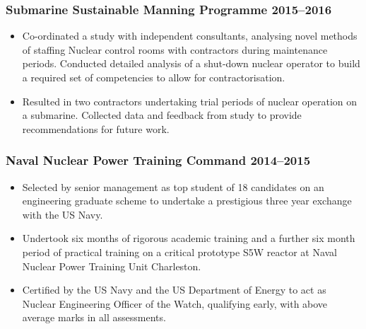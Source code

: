 \documentclass[a4paper, oneside, final, 11pt]{scrartcl} %
\begin{document}
\subsubsection*{Submarine Sustainable Manning Programme \hfill 2015--2016}  
\normalfont
\begin{itemize}
	\item Co-ordinated a study with independent consultants, analysing novel methods of staffing Nuclear control rooms with contractors during maintenance periods. Conducted detailed analysis of a shut-down nuclear operator to build a required set of competencies to allow for contractorisation.
	
	\item  Resulted in two contractors undertaking trial periods of nuclear operation on a submarine. Collected data and feedback from study to provide recommendations for future work. \end{itemize}


				
\subsubsection*{Naval Nuclear Power Training Command \hfill 2014--2015}  
\normalfont
\begin{itemize}
	\item Selected by senior management as top student of 18 candidates on an engineering graduate scheme to undertake a prestigious three year exchange with the US Navy. 
	
	\item Undertook six months of rigorous academic training and a further six month period of practical training on a critical prototype S5W reactor at Naval Nuclear Power Training Unit Charleston.
	\item Certified by the US Navy and the US Department of Energy to act as Nuclear Engineering Officer of the Watch, qualifying early, with above average marks in all assessments.
\end{itemize}


				
\end{document}
